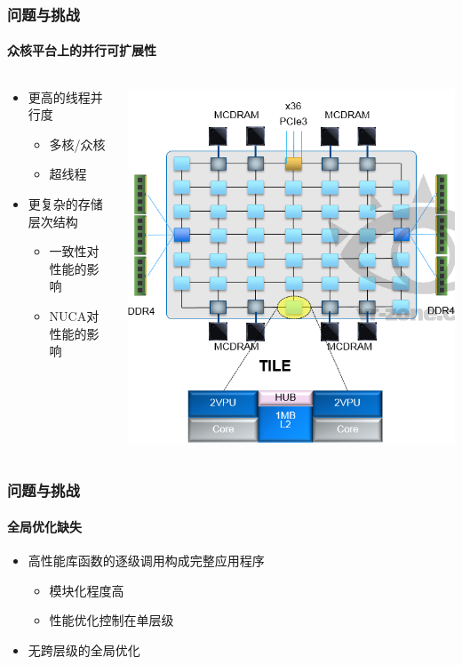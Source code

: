 \documentclass[aspectratio=169]{beamer}
\begin{document}
\begin{frame}
  \frametitle{问题与挑战}
  \framesubtitle{众核平台上的并行可扩展性}
  \begin{columns}
    \begin{column}{.4\textwidth}
      \begin{itemize}
      \item 更高的线程并行度
        \begin{itemize}
        \item 多核/众核
        \item 超线程
        \end{itemize}
      \item 更复杂的存储层次结构
        \begin{itemize}
        \item 一致性对性能的影响
        \item NUCA对性能的影响
        \end{itemize}
      \end{itemize}
    \end{column}
    \begin{column}{.6\textwidth}
      \includegraphics[width=.7\textwidth]{knl1}
    \end{column}
  \end{columns}
\end{frame}

\begin{frame}
  \frametitle{问题与挑战}
  \framesubtitle{全局优化缺失}
  \begin{itemize}
  \item 高性能库函数的逐级调用构成完整应用程序
    \begin{itemize}
    \item 模块化程度高
    \item 性能优化控制在单层级
    \end{itemize}
  \item 无跨层级的全局优化
  \end{itemize}
\end{frame}
\end{document}
